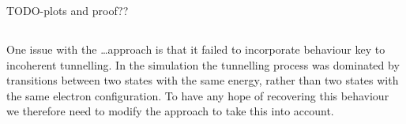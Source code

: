 TODO-plots and proof??
\subsection{}

One issue with the \ldots approach is that it failed to
incorporate behaviour key to incoherent tunnelling.
In the simulation the tunnelling process was dominated by
transitions between two states with the same energy,
rather than two states with the same electron configuration.
To have any hope of recovering this behaviour we therefore need
to modify the approach to take this into account.







